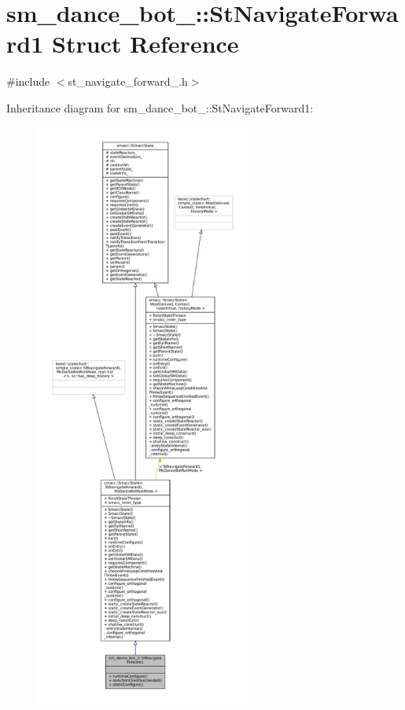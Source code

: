 \hypertarget{structsm__dance__bot__2_1_1StNavigateForward1}{}\section{sm\+\_\+dance\+\_\+bot\+\_\+:\+:St\+Navigate\+Forward1 Struct Reference}
\label{structsm__dance__bot__2_1_1StNavigateForward1}


{\ttfamily \#include $<$st\+\_\+navigate\+\_\+forward\+\_.\+h$>$}



Inheritance diagram for sm\+\_\+dance\+\_\+bot\+\_\+:\+:St\+Navigate\+Forward1\+:
\nopagebreak
\begin{figure}[H]
\begin{center}
\leavevmode
\includegraphics[height=550pt]{structsm__dance__bot__2_1_1StNavigateForward1__inherit__graph}
\end{center}
\end{figure}


